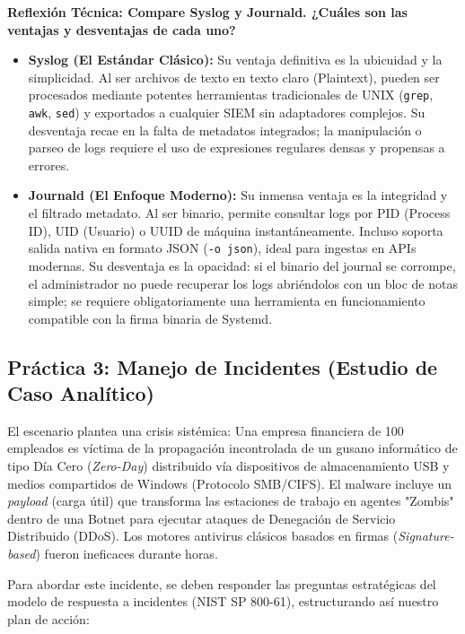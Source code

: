 \documentclass[12pt,a4paper]{article}
\begin{document}
\textbf{Reflexión Técnica: Compare Syslog y Journald. ¿Cuáles son las ventajas y desventajas de cada uno?}
\begin{itemize}
    \item \textbf{Syslog (El Estándar Clásico):} Su ventaja definitiva es la ubicuidad y la simplicidad. Al ser archivos de texto en texto claro (Plaintext), pueden ser procesados mediante potentes herramientas tradicionales de UNIX (\texttt{grep}, \texttt{awk}, \texttt{sed}) y exportados a cualquier SIEM sin adaptadores complejos. Su desventaja recae en la falta de metadatos integrados; la manipulación o parseo de logs requiere el uso de expresiones regulares densas y propensas a errores.
    \item \textbf{Journald (El Enfoque Moderno):} Su inmensa ventaja es la integridad y el filtrado metadato. Al ser binario, permite consultar logs por PID (Process ID), UID (Usuario) o UUID de máquina instantáneamente. Incluso soporta salida nativa en formato JSON (\texttt{-o json}), ideal para ingestas en APIs modernas. Su desventaja es la opacidad: si el binario del journal se corrompe, el administrador no puede recuperar los logs abriéndolos con un bloc de notas simple; se requiere obligatoriamente una herramienta en funcionamiento compatible con la firma binaria de Systemd.
\end{itemize}

\subsection{Práctica 3: Manejo de Incidentes (Estudio de Caso Analítico)}

El escenario plantea una crisis sistémica: Una empresa financiera de 100 empleados es víctima de la propagación incontrolada de un gusano informático de tipo Día Cero (\textit{Zero-Day}) distribuido vía dispositivos de almacenamiento USB y medios compartidos de Windows (Protocolo SMB/CIFS). El malware incluye un \textit{payload} (carga útil) que transforma las estaciones de trabajo en agentes "Zombis" dentro de una Botnet para ejecutar ataques de Denegación de Servicio Distribuido (DDoS). Los motores antivirus clásicos basados en firmas (\textit{Signature-based}) fueron ineficaces durante horas.

Para abordar este incidente, se deben responder las preguntas estratégicas del modelo de respuesta a incidentes (NIST SP 800-61), estructurando así nuestro plan de acción:
\end{document}
